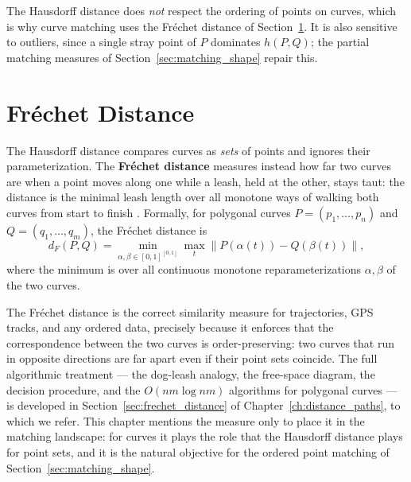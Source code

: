 \begin{remark}
  The Hausdorff distance does \emph{not} respect the ordering of points on
  curves, which is why curve matching uses the Fr\'echet distance of
  Section~\ref{sec:matching_frechet}. It is also sensitive to outliers,
  since a single stray point of $P$ dominates $h(P,Q)$; the partial matching
  measures of Section~\ref{sec:matching_shape} repair this.
\end{remark}


\section{Fr\'echet Distance}
\label{sec:matching_frechet}

The Hausdorff distance compares curves as
\emph{sets} of points and ignores their parameterization. The
\textbf{Fr\'echet distance} measures instead how far two curves are when a
point moves along one while a leash, held at the other, stays taut: the
distance is the minimal leash length over all monotone ways of walking both
curves from start to finish \cite{frechet1906}. Formally, for polygonal
curves $P = (p_1, \dots, p_n)$ and $Q = (q_1, \dots, q_m)$, the Fr\'echet
distance is
\[
  d_F(P,Q) = \min_{\alpha,\beta \in [0,1]^{[0,1]}} \max_{t} \| P(\alpha(t)) - Q(\beta(t)) \| ,
\]
where the minimum is over all continuous monotone reparameterizations
$\alpha, \beta$ of the two curves.

The Fr\'echet distance is the correct similarity measure for trajectories,
GPS tracks, and any ordered data, precisely because it enforces that the
correspondence between the two curves is order-preserving: two curves that
run in opposite directions are far apart even if their point sets coincide.
The full algorithmic treatment --- the dog-leash analogy, the free-space
diagram, the decision procedure, and the $O(nm \log nm)$ algorithms for
polygonal curves \cite{alt1995} --- is developed in
Section~\ref{sec:frechet_distance} of Chapter~\ref{ch:distance_paths}, to
which we refer. This chapter mentions the measure only to place it in the
matching landscape: for curves it plays the role that the Hausdorff distance
plays for point sets, and it is the natural objective for the ordered point
matching of Section~\ref{sec:matching_shape}.


